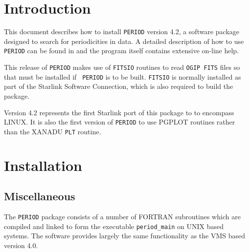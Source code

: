  \begin{latexonly}
   \setlength{\parskip}{0mm}
   \latexonlytoc
   \setlength{\parskip}{\medskipamount}
   \markright{\stardocname}
 \end{latexonly}
\newpage
\renewcommand{\thepage}{\arabic{page}}

\section{Introduction}
 
This document describes how to install {\tt PERIOD} version 4.2, a
software package designed to search for periodicities in data.  A
detailed description of how to use {\tt PERIOD} can be found in
 and the program itself contains extensive
on-line help. 

This release of {\tt PERIOD} makes use of {\tt FITSIO} routines
to read {\tt OGIP FITS} files so that must be installed if {\tt
PERIOD} is to be built.  {\tt FITSIO} is normally installed as part of
the Starlink Software Connection, which is also required to build the
package.

Version 4.2 represents the first Starlink port of this package to
to encompass LINUX. It is also  the first version of {\tt PERIOD} to use 
PGPLOT routines rather than the XANADU {\tt PLT} routine.  

\section{Installation}

\subsection{Miscellaneous}

The {\tt PERIOD} package consists of a number of FORTRAN subroutines
which are compiled and linked to form the executable {\tt period\_main}
on UNIX based systems.  The software provides largely the same functionality as
the VMS based version 4.0.

